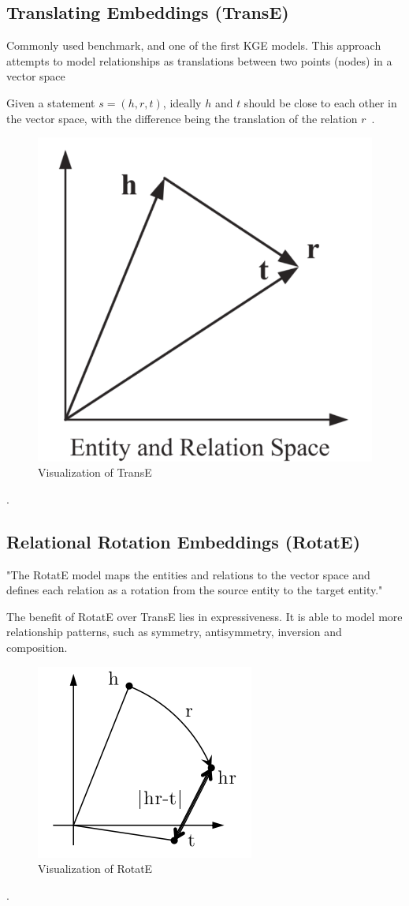 \subsection{Translating Embeddings (TransE)}
Commonly used benchmark, and one of the first KGE models.
This approach attempts to model relationships as translations between two points (nodes) in a vector space

Given a statement $s = (h,r,t)$, ideally $h$ and $t$ should be close to each other in the vector space,
with the difference being the translation of the relation $r$~\cite{TransE}.


\begin{figure}[h] %
    \centering %
    \includegraphics[width=0.35\linewidth]{figures/transe} %
    \caption{Visualization of TransE~\cite{TransEFig}}
    \label{fig:transe-example}
\end{figure}.

\FloatBarrier

\subsection{Relational Rotation Embeddings (RotatE)}
"The RotatE model maps
the entities and relations to the vector space and defines each relation as a rotation from
the source entity to the target entity."~\cite{RotatE}

The benefit of RotatE over TransE lies in expressiveness.
It is able to model more relationship patterns, such as symmetry, antisymmetry, inversion
and composition.

\begin{figure}[h] %
    \centering %
    \includegraphics[width=0.35\linewidth]{figures/rotate} %
    \caption{Visualization of RotatE~\cite{RotatE}}
    \label{fig:rotate}
\end{figure}.

